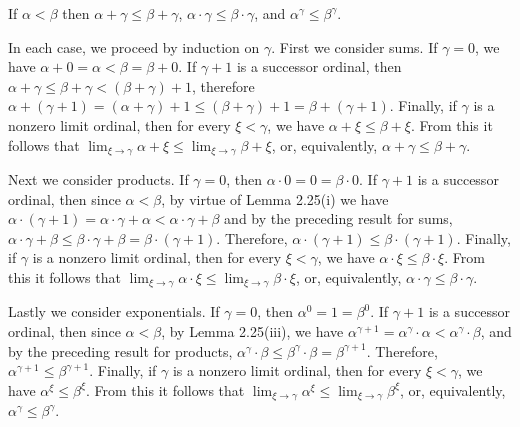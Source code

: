  If $\alpha < \beta$ then $\alpha + \gamma \leq \beta + \gamma$, 
$\alpha \cdot \gamma \leq \beta \cdot \gamma$, and 
$\alpha^{\gamma} \leq \beta^{\gamma}$.
\begin{solution}
In each case, we proceed by induction on $\gamma$. First we consider sums. If 
$\gamma = 0$, we have $\alpha + 0 = \alpha < \beta = \beta + 0$. If 
$\gamma + 1$ is a successor ordinal, then 
$\alpha + \gamma \leq \beta + \gamma < \left( \beta + \gamma \right) + 1$, 
therefore $\alpha + \left( \gamma + 1 \right) = \left( \alpha + \gamma \right)
+ 1 \leq \left( \beta + \gamma \right) + 1 = \beta + \left( \gamma + 1
\right)$. Finally, if $\gamma$ is a nonzero limit ordinal, then for every 
$\xi < \gamma$, we have $\alpha + \xi \leq \beta + \xi$. From this it follows 
that $\lim_{\xi \rightarrow \gamma} \alpha + \xi \leq \lim_{\xi \rightarrow 
\gamma} \beta + \xi$, or, equivalently, $\alpha + \gamma \leq \beta + \gamma$.

Next we consider products. If $\gamma = 0$, then 
$\alpha \cdot 0 = 0 = \beta \cdot 0$. If $\gamma + 1$ is a successor ordinal, 
then since $\alpha < \beta$, by virtue of Lemma 2.25(i) we have 
$\alpha \cdot \left( \gamma + 1 \right) = \alpha \cdot \gamma + \alpha < \alpha
\cdot \gamma + \beta$ and by the preceding result for sums, 
$\alpha \cdot \gamma + \beta \leq \beta \cdot \gamma + \beta = \beta \cdot 
\left( \gamma + 1 \right)$. Therefore, 
$\alpha \cdot \left( \gamma + 1 \right) \leq \beta \cdot \left( \gamma + 1 
\right)$. Finally, if $\gamma$ is a nonzero limit ordinal, then for every 
$\xi < \gamma$, we have $\alpha \cdot \xi \leq \beta \cdot \xi$. From this it 
follows that 
$\lim_{\xi \rightarrow \gamma} \alpha \cdot \xi \leq \lim_{\xi \rightarrow 
\gamma} \beta \cdot \xi$, or, equivalently, 
$\alpha \cdot \gamma \leq \beta \cdot \gamma$.

Lastly we consider exponentials. If $\gamma = 0$, then 
$\alpha^0 = 1 = \beta^0$. If $\gamma + 1$ is a successor ordinal, then since 
$\alpha < \beta$, by Lemma 2.25(iii), we have 
$\alpha^{\gamma + 1} = \alpha^{\gamma} \cdot \alpha < \alpha^{\gamma} \cdot 
\beta$, and by the preceding result for products, 
$\alpha^{\gamma} \cdot \beta \leq \beta^{\gamma} \cdot \beta = \beta^{\gamma + 
1}$. Therefore, $\alpha^{\gamma + 1} \leq \beta^{\gamma + 1}$. Finally, if 
$\gamma$ is a nonzero limit ordinal, then for every $\xi < \gamma$, we have 
$\alpha^{\xi} \leq \beta^{\xi}$. From this it follows that 
$\lim_{\xi \rightarrow \gamma} \alpha^{\xi} \leq \lim_{\xi \rightarrow \gamma} 
\beta^{\xi}$, or, equivalently, $\alpha^{\gamma} \leq \beta^{\gamma}$.
\end{solution}

